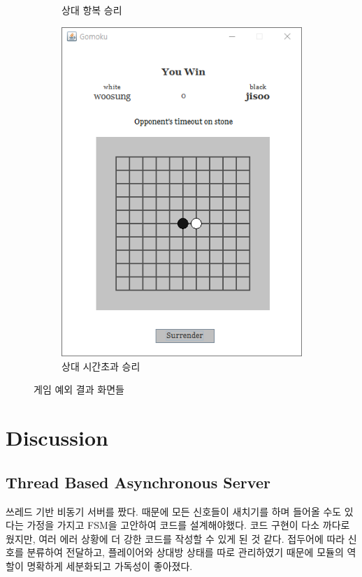 \documentclass[a4paper, 10pt]{article}
\begin{document}
\begin{figure}[h]
\begin{subfigure}{.24\textwidth}
    \caption{상대 항복 승리}
    \label{fig:draw}
  \end{subfigure}
  \begin{subfigure}{.24\textwidth}
    \centering
    \includegraphics[width=.9\linewidth]{resource/stone_timeout}
    \caption{상대 시간초과 승리}
    \label{fig:draw}
  \end{subfigure}
  \caption{게임 예외 결과 화면들}
\end{figure}
\newpage

\section{Discussion}
\subsection{Thread Based Asynchronous Server}
쓰레드 기반 비동기 서버를 짰다. 때문에 모든 신호들이 새치기를 하며 들어올 수도
있다는 가정을 가지고 FSM을 고안하여 코드를 설계해야했다. 코드 구현이 다소
까다로웠지만, 여러 에러 상황에 더 강한 코드를 작성할 수 있게 된 것 같다.
접두어에 따라 신호를 분류하여 전달하고, 플레이어와 상대방 상태를 따로 관리하였기
때문에 모듈의 역할이 명확하게 세분화되고 가독성이 좋아졌다.
\end{document}
